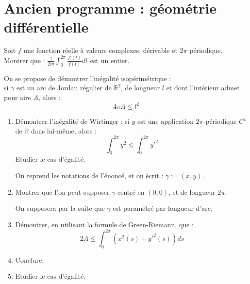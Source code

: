 \section{Ancien programme : g\'eom\'etrie diff\'erentielle}

\begin{exer}
Soit $f$ une fonction r\'eelle \`a valeurs complexes, d\'erivable et  $2 \pi$ p\'eriodique.\\
Montrer que : $\frac{1}{2i\pi} \int_0^{2 \pi} \frac{f'(t)}{f(t)} dt$ est un entier.
\end{exer}

\begin{exer}
On se propose de démontrer l'inégalité isopérimétrique :\\
si $\gamma$ est un arc de Jordan régulier de $\mathbb{R}^2$, de longueur $l$ et dont l'intérieur admet pour aire $A$, alors :
\[4 \pi A \leq l^2\]
\begin{enumerate}
\item Démontrer l'inégalité de Wirtinger : si $y$ est une application $2 \pi$-périodique $C^1$ de $\mathbb{R}$ dans lui-même, alors :
\[\int_{0}^{2 \pi} y^2 \leq \int_{0}^{2 \pi} y'^2\]
Etudier le cas d'égalité.

\smallskip
On reprend les notations de l'énoncé, et on écrit : $\gamma := (x,y)$.
\item Montrer que l'on peut supposer $\gamma$ centré en $(0,0)$, et de longueur $2 \pi$.

\smallskip
On supposera par la suite que $\gamma$ est paramétré par longueur d'arc.
\item Démontrer, en utilisant la formule de Green-Riemann, que :\[2A \leq \int_{0}^{2 \pi} (x^2 (s) + y'^2 (s))ds\]
\item Conclure.
\item Etudier le cas d'égalité.
\end{enumerate}
\end{exer}